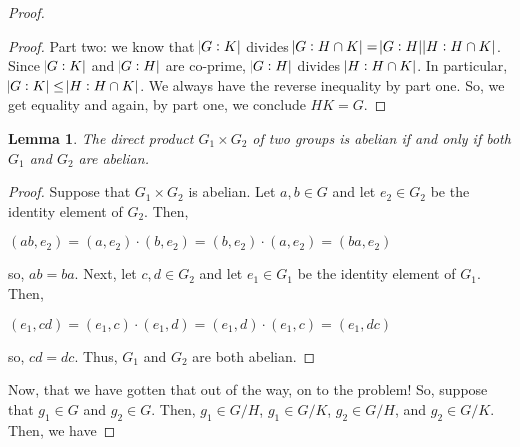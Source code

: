 \documentclass[executivepaper]{article}
\newtheorem{lemma}[theorem]{Lemma}
\begin{document}
\begin{flushleft}
\begin{proof}
\begin{proof}
\vspace{3mm}

Part two: we know that $\abs{G : K}$ divides $\abs{G : H \cap K}=\abs{G : H}\abs{H : H \cap K}$. Since $\abs{G : K}$ and $\abs{G : H}$ are co-prime, $\abs{G : H}$ divides $\abs{H : H \cap K}$. In particular, $\abs{G : K} \leq \abs{H : H \cap K}$. We always have the reverse inequality by part one. So, we get equality and again, by part one, we conclude $HK=G$. 

\end{proof}

\vspace{5mm}

\begin{lemma}

The direct product $G_{1} \times G_{2}$ of two groups is abelian if and only if both $G_{1}$ and $G_{2}$ are abelian.

\end{lemma}

\vspace{3mm}

\begin{proof}

Suppose that $G_{1} \times G_{2}$ is abelian. Let $a, b \in G$ and let $e_{2} \in G_{2}$ be the identity element of $G_{2}$. Then,

\begin{center}

$(ab, e_{2})=(a, e_{2}) \cdot (b, e_{2})=(b, e_{2}) \cdot (a, e_{2})=(ba, e_{2})$

\end{center}

so, $ab=ba$. Next, let $c, d \in G_{2}$ and let $e_{1} \in G_{1}$ be the identity element of $G_{1}$. Then,

\begin{center}

$(e_{1}, cd)=(e_{1}, c) \cdot (e_{1}, d)=(e_{1}, d) \cdot (e_{1}, c)=(e_{1}, dc)$

\end{center}

so, $cd=dc$. Thus, $G_{1}$ and $G_{2}$ are both abelian.

\end{proof}

\vspace{5mm}

Now, that we have gotten that out of the way, on to the problem! So, suppose that $g_{1} \in G$ and $g_{2} \in G$. Then, $g_{1} \in G/H$, $g_{1} \in G/K$, $g_{2} \in G/H$, and $g_{2} \in G/K$. Then, we have


\end{proof}
\end{flushleft}
\end{document}
